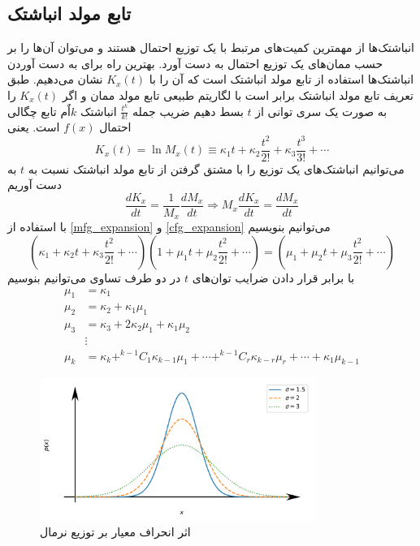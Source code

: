 \subsection{تابع مولد انباشتک}
انباشتک‌ها از مهمترین کمیت‌های مرتبط با یک توزیع احتمال هستند و می‌توان آن‌ها را بر حسب ممان‌های یک توزیع احتمال به دست آورد. بهترین راه برای به دست آوردن انباشتک‌ها استفاده از تابع مولد انباشتک است که آن را با $K_{x}(t)$ نشان می‌دهیم. طبق تعریف تابع مولد انباشتک برابر است با لگاریتم طبیعی تابع مولد ممان و اگر $K_{x}(t)$ را به صورت یک سری توانی از $t$ بسط دهیم ضریب جمله $\frac{t^k}{k!}$ انباشتک $k$اٌم تابع چگالی احتمال $f(x)$ است. یعنی
\begin{equation}
    K_{x}(t)=\ln M_{x}(t) \equiv \kappa_{1} t+\kappa_{2} \frac{t^{2}}{2 !}+\kappa_{3} \frac{t^{3}}{3 !}+\cdots
    \label{cfg_expansion}
\end{equation}
می‌توانیم انباشتک‌های یک توزیع را با مشتق گرفتن از تابع مولد انباشتک نسبت به $t$ به دست آوریم
\begin{equation}
    \frac{d K_{x}}{d t}=\frac{1}{M_{x}} \frac{d M_{x}}{d t} \Rightarrow M_{x} \frac{d K_{x}}{d t} = \frac{d M_{x}}{d t}
\end{equation}
با استفاده از \ref{mfg_expansion} و \ref{cfg_expansion} می‌توانیم بنویسیم
\begin{equation}
    (\kappa_{1}+\kappa_{2} t+\kappa_{3} \frac{t^{2}}{2 !}+\cdots)(1+\mu_{1} t+\mu_{2} \frac{t^{2}}{2 !}+\cdots)=(\mu_{1}+\mu_{2} t+\mu_{3} \frac{t^{2}}{2 !}+\cdots)
\end{equation}
با برابر قرار دادن ضرایب توان‌های $t$ در دو طرف تساوی می‌توانیم بنوسیم
$$
\begin{aligned} \mu_{1} &=\kappa_{1} \\ \mu_{2} &=\kappa_{2}+\kappa_{1} \mu_{1} \\ \mu_{3} &=\kappa_{3}+2 \kappa_{2} \mu_{1}+\kappa_{1} \mu_{2} \\ & \vdots \\ \mu_{k} &=\kappa_{k}+^{k-1} C_{1} \kappa_{k-1} \mu_{1}+\cdots+^{k-1} C_{r} \kappa_{k-r} \mu_{r}+\cdots+\kappa_{1} \mu_{k-1} \end{aligned}
$$
\begin{figure}[htb]
    \centering
    \includegraphics[width=0.8\textwidth]{images/dist_variance_effect.pdf}
    \caption{اثر انحراف معیار بر توزیع نرمال} %
    \par\medskip
\captionsetup{justification=centering}
\end{figure}
